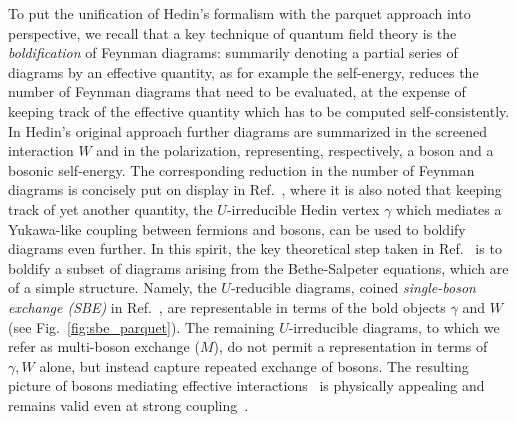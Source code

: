 \documentclass[epj]{svjour}
\begin{document}
To put the unification of Hedin's formalism with the parquet approach into perspective,
we recall that a key technique of quantum field theory is the {\sl boldification} of Feynman diagrams:
summarily denoting a partial series of diagrams by an effective quantity, as for example the self-energy,
reduces the number of Feynman diagrams that need to be evaluated,
at the expense of keeping track of the effective quantity which has to be computed self-consistently.
In Hedin's original approach further diagrams are summarized in the screened interaction $W$ and in the polarization,
representing, respectively, a boson and a bosonic self-energy.
The corresponding reduction in the number of Feynman diagrams is concisely put on display in Ref.~\cite{Molinari06},
where it is also noted that keeping track of yet another quantity,
the $U$-irreducible Hedin vertex $\gamma$ which mediates a Yukawa-like coupling between fermions and bosons,
can be used to boldify diagrams even further.
In this spirit, the key theoretical step taken in Ref.~\cite{Krien21-2} is to boldify a subset of diagrams arising from the Bethe-Salpeter equations, which are of a simple structure.
Namely, the $U$-reducible diagrams, coined {\sl single-boson exchange (SBE)} in Ref.~\cite{Krien19-2},
are representable in terms of the bold objects $\gamma$ and $W$ (see Fig.~\ref{fig:sbe_parquet}).
The remaining $U$-irreducible diagrams, to which we refer as multi-boson exchange ($M$),
do not permit a representation in terms of $\gamma, W$ alone, but instead capture repeated exchange of bosons.
The resulting picture of bosons mediating effective interactions~\cite{Bonetti22}
is physically appealing and remains valid even at strong coupling~\cite{Harkov21,Krien21}.
\end{document}
